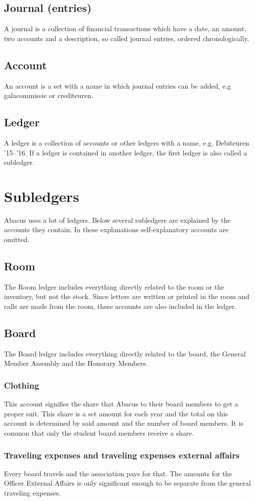 \documentclass{report}
\begin{document}
\subsection{Journal (entries)}
A journal is a collection of financial transactions which have a date, an amount, two accounts and a description, so called journal entries, ordered chronologically.
\subsection{Account}
An account is a set with a name in which journal entries can be added, e.g galacommissie or crediteuren.
\subsection{Ledger}
A ledger is a collection of accounts or other ledgers with a name, e.g. Debiteuren '15--'16. If a ledger is contained in another ledger, the first ledger is also called a subledger.
\section{Subledgers}
Abacus uses a lot of ledgers. Below several subledgers are explained by the accounts they contain. In these explanations self-explanatory accounts are omitted.
\subsection{Room}
The Room ledger includes everything directly related to the room or the inventory, but not the stock. Since letters are written or printed in the room and calls are made from the room, these accounts are also included in the ledger. 
\subsection{Board}
The Board ledger includes everything directly related to the board, the General Member Assembly and the Honorary Members. 
\subsubsection{Clothing}
This account signifies the share that Abacus to their board members to get a proper suit. This share is a set amount for each year and the total on this account is determined by said amount and the number of board members. It is common that only the student board members receive a share.
\subsubsection{Traveling expenses and traveling expenses external affairs}
Every board travels and the association pays for that. The amounts for the Officer External Affairs is only significant enough to be separate from the general traveling expenses. 
\end{document}
